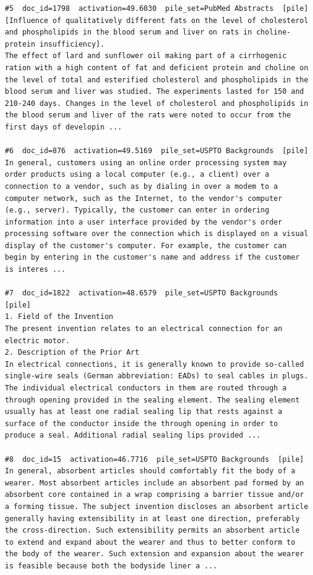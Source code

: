 \begin{verbatim}
#5  doc_id=1798  activation=49.6030  pile_set=PubMed Abstracts  [pile]
[Influence of qualitatively different fats on the level of cholesterol and phospholipids in the blood serum and liver on rats in choline-protein insufficiency].
The effect of lard and sunflower oil making part of a cirrhogenic ration with a high content of fat and deficient protein and choline on the level of total and esterified cholesterol and phospholipids in the blood serum and liver was studied. The experiments lasted for 150 and 210-240 days. Changes in the level of cholesterol and phospholipids in the blood serum and liver of the rats were noted to occur from the first days of developin ...

#6  doc_id=876  activation=49.5169  pile_set=USPTO Backgrounds  [pile]
In general, customers using an online order processing system may order products using a local computer (e.g., a client) over a connection to a vendor, such as by dialing in over a modem to a computer network, such as the Internet, to the vendor's computer (e.g., server). Typically, the customer can enter in ordering information into a user interface provided by the vendor's order processing software over the connection which is displayed on a visual display of the customer's computer. For example, the customer can begin by entering in the customer's name and address if the customer is interes ...

#7  doc_id=1822  activation=48.6579  pile_set=USPTO Backgrounds  [pile]
1. Field of the Invention
The present invention relates to an electrical connection for an electric motor.
2. Description of the Prior Art
In electrical connections, it is generally known to provide so-called single-wire seals (German abbreviation: EADs) to seal cables in plugs. The individual electrical conductors in them are routed through a through opening provided in the sealing element. The sealing element usually has at least one radial sealing lip that rests against a surface of the conductor inside the through opening in order to produce a seal. Additional radial sealing lips provided ...

#8  doc_id=15  activation=46.7716  pile_set=USPTO Backgrounds  [pile]
In general, absorbent articles should comfortably fit the body of a wearer. Most absorbent articles include an absorbent pad formed by an absorbent core contained in a wrap comprising a barrier tissue and/or a forming tissue. The subject invention discloses an absorbent article generally having extensibility in at least one direction, preferably the cross-direction. Such extensibility permits an absorbent article to extend and expand about the wearer and thus to better conform to the body of the wearer. Such extension and expansion about the wearer is feasible because both the bodyside liner a ...


\end{verbatim}
